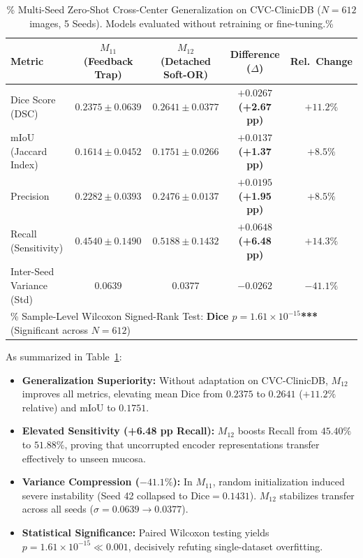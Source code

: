 \begin{table}[t!]
\centering
\caption{\%
  Multi-Seed Zero-Shot Cross-Center Generalization on CVC-ClinicDB
  ($N = 612$ images, 5 Seeds). Models evaluated without retraining
  or fine-tuning.\%
}
\label{tab:zero_shot}
\begin{tabularx}{\textwidth}{l c c c c}
\toprule
\textbf{Metric}
  & \textbf{$M_{11}$ (Feedback Trap)}
  & \textbf{$M_{12}$ (Detached Soft-OR)}
  & \textbf{Difference ($\Delta$)}
  & \textbf{Rel.\ Change} \\
\midrule
Dice Score (DSC)
  & $0.2375 \pm 0.0639$
  & \textbf{$0.2641 \pm 0.0377$}
  & \textbf{$+0.0267$ (+2.67 pp)}
  & \textbf{$+11.2\%$} \\
mIoU (Jaccard Index)
  & $0.1614 \pm 0.0452$
  & \textbf{$0.1751 \pm 0.0266$}
  & \textbf{$+0.0137$ (+1.37 pp)}
  & \textbf{$+8.5\%$}  \\
Precision
  & $0.2282 \pm 0.0393$
  & \textbf{$0.2476 \pm 0.0137$}
  & \textbf{$+0.0195$ (+1.95 pp)}
  & \textbf{$+8.5\%$}  \\
Recall (Sensitivity)
  & $0.4540 \pm 0.1490$
  & \textbf{$0.5188 \pm 0.1432$}
  & \textbf{$+0.0648$ (+6.48 pp)}
  & \textbf{$+14.3\%$} \\
Inter-Seed Variance (Std)
  & $0.0639$
  & \textbf{$0.0377$}
  & \textbf{$-0.0262$}
  & \textbf{$-41.1\%$} \\
\midrule
\multicolumn{5}{l}{\%
  Sample-Level Wilcoxon Signed-Rank Test:
  \textbf{Dice $p = 1.61 \times 10^{-15}$***}
  (Significant across $N = 612$)} \\
\bottomrule
\end{tabularx}
\end{table}

As summarized in Table~\ref{tab:zero_shot}:
\begin{itemize}
  \item \textbf{Generalization Superiority:} Without adaptation on CVC-ClinicDB,
        $M_{12}$ improves all metrics, elevating mean Dice from $0.2375$ to
        \textbf{$0.2641$} ($+11.2\%$ relative) and mIoU to \textbf{$0.1751$}.
  \item \textbf{Elevated Sensitivity (+6.48 pp Recall):} $M_{12}$ boosts
        Recall from $45.40\%$ to \textbf{$51.88\%$}, proving that uncorrupted
        encoder representations transfer effectively to unseen mucosa.
  \item \textbf{Variance Compression ($-41.1\%$):} In $M_{11}$, random initialization
        induced severe instability (Seed 42 collapsed to $\text{Dice} = 0.1431$).
        $M_{12}$ stabilizes transfer across all seeds ($\sigma = 0.0639 \to 0.0377$).
  \item \textbf{Statistical Significance:} Paired Wilcoxon testing yields
        $p = 1.61 \times 10^{-15} \ll 0.001$, decisively refuting single-dataset overfitting.
\end{itemize}

